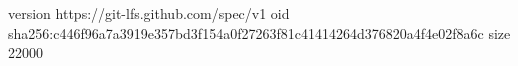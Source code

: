 version https://git-lfs.github.com/spec/v1
oid sha256:c446f96a7a3919e357bd3f154a0f27263f81c41414264d376820a4f4e02f8a6c
size 22000
